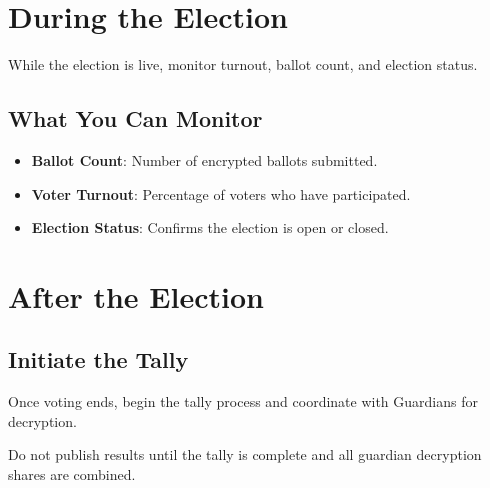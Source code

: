 \documentclass[12pt,a4paper]{book}
\begin{document}
\chapter{During the Election}

While the election is live, monitor turnout, ballot count, and election status.

\section{What You Can Monitor}

\begin{itemize}
  \item \textbf{Ballot Count}: Number of encrypted ballots submitted.
  \item \textbf{Voter Turnout}: Percentage of voters who have participated.
  \item \textbf{Election Status}: Confirms the election is open or closed.
\end{itemize}

\chapter{After the Election}

\section{Initiate the Tally}

Once voting ends, begin the tally process and coordinate with Guardians for decryption.

\begin{tcolorbox}[warnbox]
Do not publish results until the tally is complete and all guardian decryption shares are combined.
\end{tcolorbox}
\end{document}
